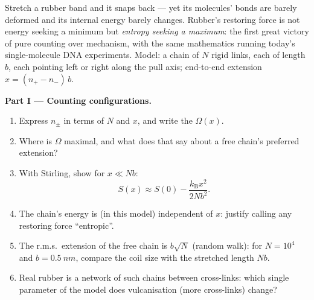 \begin{problem}\label{pb:b3:microcanonical-ensemble:1}
Stretch a rubber band and it snaps back --- yet its molecules'
bonds are barely deformed and its internal energy barely changes.
Rubber's restoring force is not energy seeking a minimum but
\emph{entropy seeking a maximum}: the first great victory of pure
counting over mechanism, with the same mathematics running today's
single-molecule DNA experiments. Model: a chain of $N$ rigid links,
each of length $b$, each pointing left or right along the pull
axis; end-to-end extension $x = (n_+ - n_-)\,b$.

\medskip\noindent\textbf{Part I --- Counting configurations.}
\begin{enumerate}
  \item Express $n_\pm$ in terms of $N$ and $x$, and write the
         $\Omega(x)$.
  \item Where is $\Omega$ maximal, and what does that say about a
        free chain's preferred extension?
  \item With Stirling, show for $x \ll Nb$:
        \[
        S(x) \approx S(0) - \frac{k_{\text{B}}x^2}{2Nb^2} .
        \]
  \item The chain's energy is (in this model) independent of $x$:
        justify calling any restoring force ``entropic''.
  \item The r.m.s.\ extension of the free chain is $b\sqrt N$
        (random walk): for $N = 10^4$ and $b = \qty{0.5}{nm}$,
        compare the coil size with the stretched length $Nb$.
  \item Real rubber is a network of such chains between
        cross-links: which single parameter of the model does
        vulcanisation (more cross-links) change?
\end{enumerate}


\end{problem}
